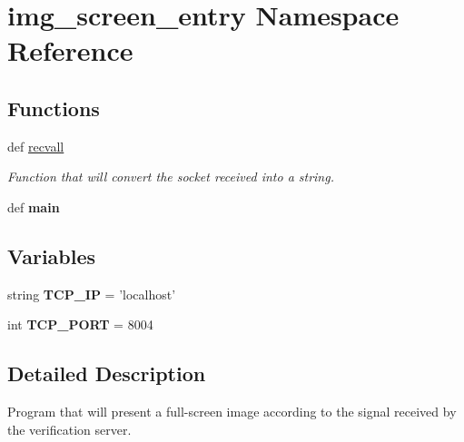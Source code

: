 \hypertarget{namespaceimg__screen__entry}{\section{img\-\_\-screen\-\_\-entry Namespace Reference}
\label{namespaceimg__screen__entry}
}
\subsection*{Functions}
\begin{DoxyCompactItemize}
\item 
def \hyperlink{namespaceimg__screen__entry_abf84aa8b7196bf3b6a61f59f66e518e4}{recvall}
\begin{DoxyCompactList}\small\item\em Function that will convert the socket received into a string. \end{DoxyCompactList}\item 
\hypertarget{namespaceimg__screen__entry_af37653694e0c32c14afbf6a49a08c9cf}{def {\bfseries main}}\label{namespaceimg__screen__entry_af37653694e0c32c14afbf6a49a08c9cf}

\end{DoxyCompactItemize}
\subsection*{Variables}
\begin{DoxyCompactItemize}
\item 
\hypertarget{namespaceimg__screen__entry_afe06b4e41a1facc65c4045482aaa4381}{string {\bfseries T\-C\-P\-\_\-\-I\-P} = 'localhost'}\label{namespaceimg__screen__entry_afe06b4e41a1facc65c4045482aaa4381}

\item 
\hypertarget{namespaceimg__screen__entry_acbc1d6aba5755d61c20444435e1b2934}{int {\bfseries T\-C\-P\-\_\-\-P\-O\-R\-T} = 8004}\label{namespaceimg__screen__entry_acbc1d6aba5755d61c20444435e1b2934}

\end{DoxyCompactItemize}


\subsection{Detailed Description}
\begin{DoxyVerb}Program that will present a full-screen image according to the signal received by the verification server.
\end{DoxyVerb}
 

